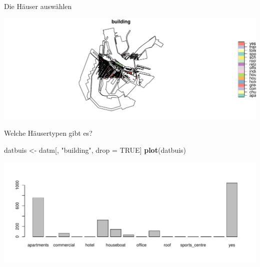 \documentclass[ignorenonframetext,]{beamer}
\newenvironment{Shaded}{\begin{snugshade}}{\end{snugshade}}
\newcommand{\KeywordTok}[1]{\textcolor[rgb]{0.13,0.29,0.53}{\textbf{#1}}}
\newcommand{\StringTok}[1]{\textcolor[rgb]{0.31,0.60,0.02}{#1}}
\newcommand{\OtherTok}[1]{\textcolor[rgb]{0.56,0.35,0.01}{#1}}
\newcommand{\OperatorTok}[1]{\textcolor[rgb]{0.81,0.36,0.00}{\textbf{#1}}}
\newcommand{\NormalTok}[1]{#1}
\begin{document}
\begin{frame}[fragile]{Die Häuser auswählen}

\begin{Shaded}
\end{Shaded}

\includegraphics{simplefeatures_files/figure-beamer/unnamed-chunk-21-1.pdf}

\end{frame}

\begin{frame}[fragile]{Welche Häusertypen gibt es?}

\begin{Shaded}
\end{Shaded}

\begin{Shaded}
\begin{Highlighting}[]
\NormalTok{datbuis <-}\StringTok{ }\NormalTok{datm[, }\StringTok{"building"}\NormalTok{, drop =}\StringTok{ }\OtherTok{TRUE}\NormalTok{]}
\KeywordTok{plot}\NormalTok{(datbuis)}
\end{Highlighting}
\end{Shaded}

\includegraphics{simplefeatures_files/figure-beamer/unnamed-chunk-23-1.pdf}

\end{frame}
\end{document}
